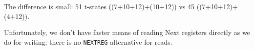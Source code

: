 \vspace*{-0.7em} %
The difference is small: 51 t-states ((7+10+12)+(10+12)) vs 45 ((7+10+12)+(4+12)). 

Unfortunately, we don't have faster means of reading Next registers directly as we do for writing; there is no {\tt NEXTREG} alternative for reads.


\pagebreak